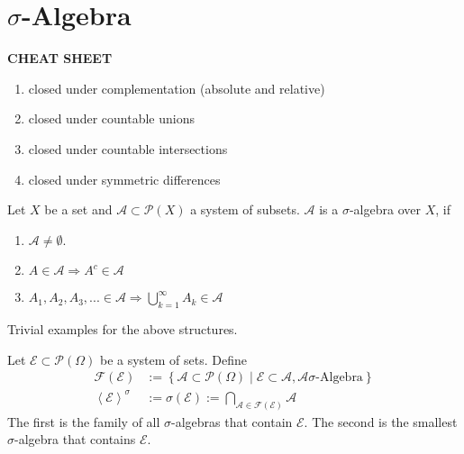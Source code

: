 \section{\(\sigma\)-Algebra}
\textbf{CHEAT SHEET}
\begin{enumerate}
    \item closed under complementation (absolute and relative)
    \item closed under countable unions
    \item closed under countable intersections
    \item closed under symmetric differences
\end{enumerate}
\begin{definition}
    Let \(X\) be a set and \(\mathcal{A} \subset \mathcal{P}(X)\) a system of subsets. \(\mathcal{A}\) is a \(\sigma\)-algebra over \(X\), if
        \begin{enumerate}
            \item \(\mathcal{A} \neq \emptyset\).
            \item \(A \in \mathcal{A} \Rightarrow A^c \in \mathcal{A}\)
            \item \(A_1, A_2, A_3, ... \in \mathcal{A} \Rightarrow \bigcup_{k=1}^\infty A_k \in \mathcal{A}\)
        \end{enumerate}
\end{definition}
\begin{example}
    Trivial examples for the above structures.
\end{example}
\begin{definition}
    Let \(\mathcal{E} \subset \mathcal{P}(\Omega)\) be a system of sets. Define
    \begin{align}
        \mathcal{F}(\mathcal{E}) &:= \left\{ \mathcal{A} \subset \mathcal{P}(\Omega) \middle| \mathcal{E} \subset \mathcal{A}, \mathcal{A} \sigma\text{-Algebra} \right\} \\
        \left< \mathcal{E}  \right>^{\sigma} &:= \sigma(\mathcal{E}) := \bigcap_{\mathcal{A} \in \mathcal{F}(\mathcal{E})} \mathcal{A}
    \end{align}
    The first is the family of all \(\sigma\)-algebras that contain \(\mathcal{E}\).
    The second is the smallest \(\sigma\)-algebra that contains \(\mathcal{E}\).
\end{definition}
%
%
%
%
%
